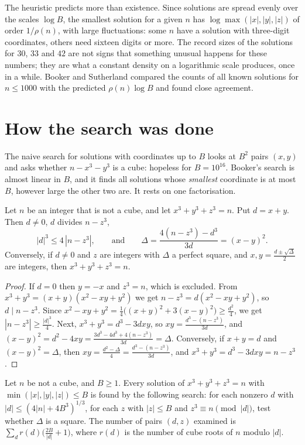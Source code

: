 The heuristic predicts more than existence. Since solutions are spread evenly over the scales $\log B$, the smallest solution for a given $n$ has $\log\max(|x|,|y|,|z|)$ of order $1/\rho(n)$,
with large fluctuations: some $n$ have a solution with three-digit coordinates, others need sixteen digits or more. The record sizes of the solutions for $30$, $33$ and $42$ are not
signs that something unusual happens for these numbers; they are what a constant density on a logarithmic scale produces, once in a while. Booker and Sutherland compared the counts
of all known solutions for $n\le1000$ with the predicted $\rho(n)\log B$ and found close agreement.

\section{How the search was done}

The naive search for solutions with coordinates up to $B$ looks at $B^2$ pairs $(x,y)$ and asks whether $n-x^3-y^3$ is a cube: hopeless for $B=10^{16}$. Booker's search is almost linear in $B$, and
it finds all solutions whose \emph{smallest} coordinate is at most $B$, however large the other two are. It rests on one factorisation.

\begin{proposition}\label{prop:booker}
Let $n$ be an integer that is not a cube, and let $x^3+y^3+z^3=n$. Put $d=x+y$. Then $d\ne0$, $d$ divides $n-z^3$,
\[
|d|^3\le4\,|n-z^3|,\qquad\text{and}\qquad\Delta=\frac{4(n-z^3)-d^3}{3d}=(x-y)^2.
\]
Conversely, if $d\ne0$ and $z$ are integers with $\Delta$ a perfect square, and $x,y=\frac{d\pm\sqrt\Delta}2$ are integers, then $x^3+y^3+z^3=n$.
\end{proposition}

\begin{proof}
If $d=0$ then $y=-x$ and $z^3=n$, which is excluded. From $x^3+y^3=(x+y)(x^2-xy+y^2)$ we get $n-z^3=d(x^2-xy+y^2)$, so $d\mid n-z^3$. Since $x^2-xy+y^2=\frac14\bigl((x+y)^2+3(x-y)^2\bigr)\ge\frac{d^2}4$, we get
$|n-z^3|\ge\frac{|d|^3}4$. Next, $x^3+y^3=d^3-3dxy$, so $xy=\frac{d^3-(n-z^3)}{3d}$, and $(x-y)^2=d^2-4xy=\frac{3d^3-4d^3+4(n-z^3)}{3d}=\Delta$. Conversely, if $x+y=d$ and $(x-y)^2=\Delta$, then $xy=\frac{d^2-\Delta}4=\frac{d^3-(n-z^3)}{3d}$,
and $x^3+y^3=d^3-3dxy=n-z^3$.
\end{proof}

\begin{corollary}\label{cor:booker}
Let $n$ be not a cube, and $B\ge1$. Every solution of $x^3+y^3+z^3=n$ with $\min(|x|,|y|,|z|)\le B$ is found by the following search: for each nonzero $d$ with $|d|\le(4|n|+4B^3)^{1/3}$, for each
$z$ with $|z|\le B$ and $z^3\equiv n\pmod{|d|}$, test whether $\Delta$ is a square. The number of pairs $(d,z)$ examined is $\sum_{d}r(d)\bigl(\frac{2B}{|d|}+1\bigr)$, where $r(d)$ is the number of
cube roots of $n$ modulo $|d|$.
\end{corollary}

